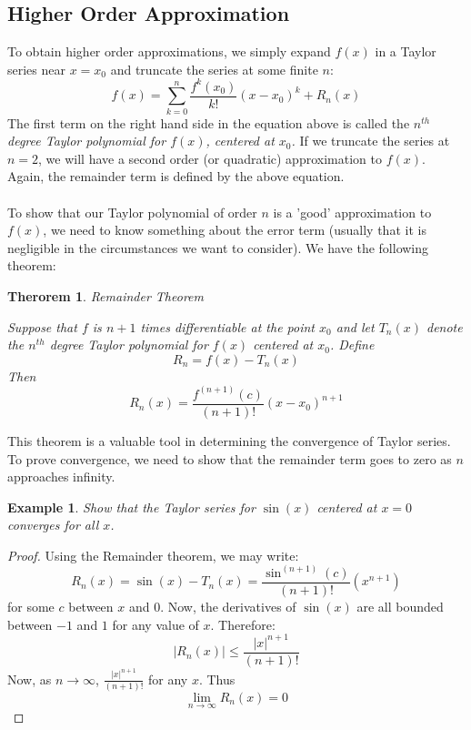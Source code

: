 \documentclass[12pt,a4paper]{article} %
\newtheorem{example}{Example}
\newtheorem{thm}{Therorem}
\begin{document}
\subsection{Higher Order Approximation}
To obtain higher order approximations, we simply expand $f(x)$ in a Taylor series near $x=x_0$ and truncate the series at some finite $n$:
\begin{equation}
f(x) = \sum_{k=0}^n \frac{f^k(x_0)}{k!}(x-x_0)^k + R_n(x)
\end{equation}
The first term on the right hand side in the equation above is called the \emph{$n^{th}$ degree Taylor polynomial for $f(x)$, centered at $x_0$.} If we truncate the series at $n=2$, we will have a second order (or quadratic) approximation to $f(x)$.  Again, the remainder term is defined by the above equation.\\ \\
To show that our Taylor polynomial of order $n$ is a 'good' approximation to $f(x)$, we need to know something about the error term (usually that it is negligible in the circumstances we want to consider).  We have the following theorem:
\begin{thm}{Remainder Theorem}

Suppose that $f$ is $n+1$ times differentiable at the point $x_0$ and let $T_n(x)$ denote the $n^{th}$ degree Taylor polynomial for $f(x)$ centered at $x_0$.  Define 
\begin{equation}
R_n  = f(x) - T_n(x)
\end{equation}
Then
\begin{equation}
R_n(x) = \frac{f^{(n+1)}(c)}{(n+1)!}(x-x_0)^{n+1}
\end{equation}
\end{thm}
This theorem is a valuable tool in determining the convergence of Taylor series.  To prove convergence, we need to show that the remainder term goes to zero as $n$ approaches infinity.  
\begin{example}
Show that the Taylor series for $\sin(x)$ centered at $x=0$ converges for all $x$.
\end{example}
\begin{proof}
Using the Remainder theorem, we may write:
\begin{equation}
R_n(x) = \sin(x) - T_n(x) = \frac{\sin^{(n+1)}(c)}{(n+1)!}(x^{n+1})
\end{equation}
for some $c$ between $x$ and $0$.  Now, the derivatives of $\sin(x)$ are all bounded between $-1$ and $1$ for any value of $x$.  Therefore:
\begin{equation}
|R_n(x)| \leq \frac{|x|^{n+1}}{(n+1)!} 
\end{equation}
Now, as $n\rightarrow\infty$, $\frac{|x|^{n+1}}{(n+1)!}$ for any $x$.  Thus 
\begin{equation}
\lim_{n\rightarrow\infty} R_n(x) = 0
\end{equation}
\end{proof}
\end{document}
